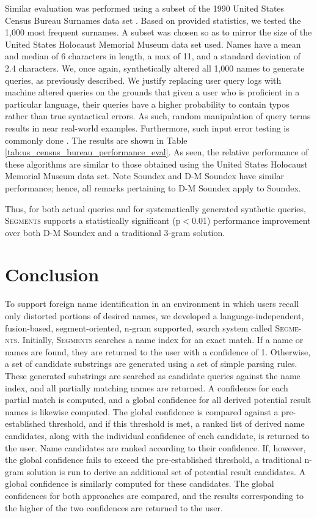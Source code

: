 \documentclass{endm}
\begin{document}
\begin{CJK}{UTF8}{song}
Similar evaluation was performed using a subset of the 1990 United States Census Bureau Surnames data set \cite{us_census_bureau}.  Based on provided statistics, we tested the 1,000 most frequent surnames.  A subset was chosen so as to mirror the size of the United States Holocaust Memorial Museum data set used.  Names have a mean and median of 6 characters in length, a max of 11, and a standard deviation of 2.4 characters.  We, once again, synthetically altered all 1,000 names to generate queries, as previously described.  We justify replacing user query logs with machine altered queries on the grounds that given a user who is proficient in a particular language, their queries have a higher probability to contain typos rather than true syntactical errors.  As such, random manipulation of query terms results in near real-world examples.  Furthermore, such input error testing is commonly done \cite{mitton:spellchecking}.  The results are shown in Table \ref{tab:us_census_bureau_performance_eval}.  As seen, the relative performance of these algorithms are similar to those obtained using the United States Holocaust Memorial Museum data set.  Note Soundex and D-M Soundex have similar performance; hence, all remarks pertaining to D-M Soundex apply to Soundex.

Thus, for both actual queries and for systematically generated synthetic queries, S\textsc{egments} supports a statistically significant (p$<$0.01) performance improvement over both D-M Soundex and a traditional 3-gram solution.

\section{Conclusion} %
\label{sec:conclusion}

To support foreign name identification in an environment in which users recall only distorted portions of desired names, we developed a language-independent, fusion-based, segment-oriented, n-gram supported, search system called S\textsc{egme-nts}.  Initially, S\textsc{egments} searches a name index for an exact match.  If a name or names are found, they are returned to the user with a confidence of 1.  Otherwise, a set of candidate substrings are generated using a set of simple parsing rules.  These generated substrings are searched as candidate queries against the name index, and all partially matching names are returned.  A confidence for each partial match is computed, and a global confidence for all derived potential result names is likewise computed.   The global confidence is compared against a pre-established threshold, and if this threshold is met, a ranked list of derived name candidates, along with the individual confidence of each candidate, is returned to the user.  Name candidates are ranked according to their confidence.  If, however, the global confidence fails to exceed the pre-established threshold, a traditional n-gram solution is run to derive an additional set of potential result candidates.  A global confidence is similarly computed for these candidates.  The global confidences for both approaches are compared, and the results corresponding to the higher of the two confidences are returned to the user.


\end{CJK}
\end{document}
